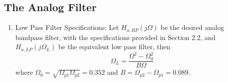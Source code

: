 \documentclass{article}
\begin{document}
\subsection{The Analog Filter}
\begin{enumerate}

    \item {Low Pass Filter Specifications:}  Let $H_{a, BP}(j\Omega)$ be the desired analog bandpass filter,  with the specifications provided in Section 2.2, and $H_{a,LP}(j\Omega_L)$ be the equivalent low pass filter, then
          \begin{equation}
              \Omega_L = \frac{\Omega^2 - \Omega_0^2}{B\Omega} \label{eq:freq_transform}
          \end{equation}
          where $\Omega_0 = \sqrt{\Omega_{p1}\Omega_{p2}} = 0.352$ and $B = \Omega_{p2} - \Omega_{p1} = 0.089$.
          

\end{enumerate}
\end{document}
